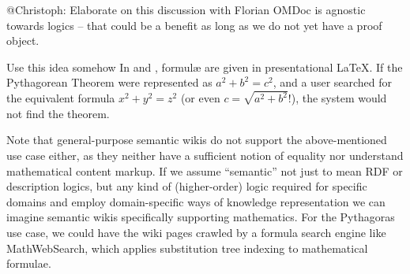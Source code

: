 
\begin{todo}{@Christoph: Elaborate on this discussion with Florian}
  OMDoc is agnostic towards logics -- that could be a benefit as long as we do
  not yet have a proof object.
\end{todo}


\begin{oldpart}{Use this idea somehow}
  In  and , formulæ are given in
  presentational {\LaTeX}.  If the Pythagorean Theorem were represented as $a^2
  + b^2 = c^2$, and a user searched for the equivalent formula $x^2 + y^2 = z^2$
  (or even $c=\sqrt{a^2+b^2}$!), the system would not find the theorem.

  Note that general-purpose semantic wikis do not support the above-mentioned
  use case either, as they neither have a sufficient notion of equality nor
  understand mathematical content markup.  If we assume ``semantic'' not just to
  mean RDF or description logics, but any kind of (higher-order) logic required
  for specific domains and employ domain-specific ways of
  knowledge representation we can imagine semantic wikis specifically supporting
  mathematics.  For the Pythagoras use case, we could have the wiki pages
  crawled by a formula search engine like MathWebSearch\cite{KohSuc:asemf06},
  which applies substitution tree indexing to mathematical formulae.
\end{oldpart}


